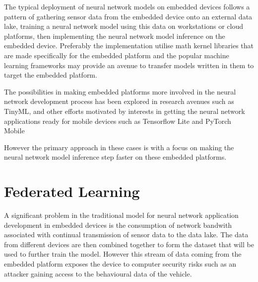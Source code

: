 The typical deployment of neural network models on embedded devices follows a pattern of gathering sensor data from the embedded device onto an external data lake, training a neural network model using this data on workstations or cloud platforms, then implementing the neural network model inference on the embedded device. Preferably the implementation utilise math kernel libraries that are made specifically for the embedded platform and the popular machine learning frameworks may provide an avenue to transfer models written in them to target the embedded platform.

The possibilities in making embedded platforms more involved in the neural network development process has been explored in research avenues such as TinyML\cite{tinyml}, and other efforts motivated by interests in getting the neural network applications ready for mobile devices such as Tensorflow Lite\cite{tfl} and PyTorch Mobile \cite{pytorch-mobile}

However the primary approach in these cases is with a focus on making the neural network model inference step faster on these embedded platforms.

\section{Federated Learning}

A significant problem in the traditional model for neural network application development in embedded devices is the consumption of network bandwith associated with continual transmission of sensor data to the data lake. The data from different devices are then combined together to form the dataset that will be used to further train the model. However this stream of data coming from the embedded platform exposes the device to computer security risks such as an attacker gaining access to the behavioural data of the vehicle.

\begin{figure}[h]
	\centering
\end{figure}

